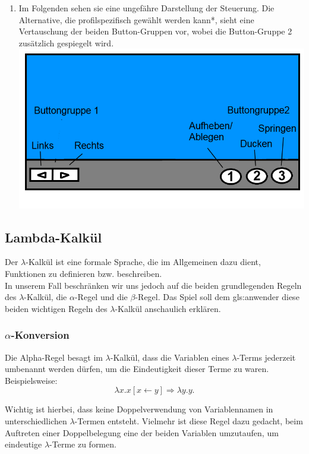 \documentclass{scrartcl}
\begin{document}
\begin{enumerate}
	\item Im Folgenden sehen sie eine ungefähre Darstellung der Steuerung. Die Alternative, die profilspezifisch gewählt werden kann*, sieht eine Vertauschung der beiden Button-Gruppen vor, wobei die Button-Gruppe 2 zusätzlich gespiegelt wird.\\
	\includegraphics[scale=0.5]{assets/Steuerung}
\end{enumerate}


\subsection{Lambda-Kalkül}  \label{subsection:LambdaKalkül}
\label{LambdaKalkül:AlgemeineErklärung}

 Der $\lambda$-Kalkül ist eine formale Sprache, die im Allgemeinen dazu dient, Funktionen zu definieren bzw. beschreiben.\\
In unserem Fall beschränken wir uns jedoch auf die beiden grundlegenden Regeln des $\lambda$-Kalkül, die $\alpha$-Regel und die $\beta$-Regel. Das Spiel soll dem \gls{gls:anwender} diese beiden wichtigen Regeln des $\lambda$-Kalkül anschaulich erklären.

\subsubsection{\texorpdfstring{$\alpha$}{Alpha}-Konversion}

Die Alpha-Regel besagt im $\lambda$-Kalkül, dass die Variablen eines $\lambda$-Terms jederzeit umbenannt werden dürfen, um die Eindeutigkeit dieser Terme zu waren. Beispielsweise:
\[
	\lambda x.x [x \leftarrow y] \Rightarrow \lambda y.y.
\]

Wichtig ist hierbei, dass keine Doppelverwendung von Variablennamen in unterschiedlichen $\lambda$-Termen entsteht. Vielmehr ist diese Regel dazu gedacht, beim Auftreten einer Doppelbelegung eine der beiden Variablen umzutaufen, um eindeutige $\lambda$-Terme zu formen.
\end{document}
